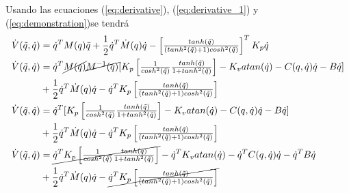 \documentclass[12pt]{article}
\begin{document}
\begin{enumerate}
    Usando las ecuaciones (\ref{eq:derivative}), (\ref{eq:derivative_1}) y (\ref{eq:demonstration})se tendrá
    \begin{equation}
        \begin{split}
            \dot{V}(\tilde{q},\dot{q})&=\dot{q}^TM(q)\ddot{q}+\frac{1}{2}\dot{q}^T\dot{M}(q)\dot{q}-
            \begin{bmatrix}
                \frac{tanh(\tilde{q})}{(tanh^2{(\tilde{q})}+1)cosh^2(\tilde{q})}
            \end{bmatrix}^TK_p\dot{q}\\
            \dot{V}(\tilde{q},\dot{q})&=\dot{q}^T\cancel{M(q)}\cancel{M^{-1}(q)}\lbrack K_p
            \begin{bmatrix}
                \frac{1}{cosh^2(\tilde{q})}\frac{tanh(\tilde{q})}{1+tanh^2(\tilde{q})}
            \end{bmatrix}
            -K_vatan(\dot{q})-C(q,\dot{q})\dot{q}-B\dot{q}\rbrack\\&+\frac{1}{2}\dot{q}^T\dot{M}(q)\dot{q}-\dot{q}^TK_p
            \begin{bmatrix}
                \frac{tanh(\tilde{q})}{(tanh^2{(\tilde{q})}+1)cosh^2(\tilde{q})}
            \end{bmatrix}\\
            \dot{V}(\tilde{q},\dot{q})&=\dot{q}^T\lbrack K_p
            \begin{bmatrix}
                \frac{1}{cosh^2(\tilde{q})}\frac{tanh(\tilde{q})}{1+tanh^2(\tilde{q})}
            \end{bmatrix}
            -K_vatan(\dot{q})-C(q,\dot{q})\dot{q}-B\dot{q}\rbrack\\&+\frac{1}{2}\dot{q}^T\dot{M}(q)\dot{q}-\dot{q}^TK_p
            \begin{bmatrix}
                \frac{tanh(\tilde{q})}{(tanh^2{(\tilde{q})}+1)cosh^2(\tilde{q})}
            \end{bmatrix}\\
            \dot{V}(\tilde{q},\dot{q})&=\cancel{\dot{q}^T K_p
            \begin{bmatrix}
                \frac{1}{cosh^2(\tilde{q})}\frac{tanh(\tilde{q})}{1+tanh^2(\tilde{q})}
            \end{bmatrix}}
            -\dot{q}^TK_vatan(\dot{q})-\dot{q}^TC(q,\dot{q})\dot{q}-\dot{q}^TB\dot{q}\\&+\frac{1}{2}\dot{q}^T\dot{M}(q)\dot{q}-\cancel{\dot{q}^TK_p
            \begin{bmatrix}
                \frac{tanh(\tilde{q})}{(tanh^2{(\tilde{q})}+1)cosh^2(\tilde{q})}

\end{bmatrix}}
\end{split}
\end{equation}
\end{enumerate}
\end{document}
